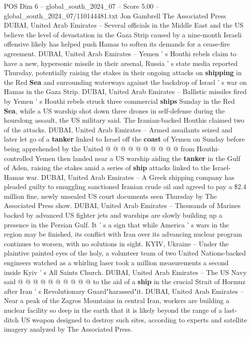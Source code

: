 \begin{textsample}{POS Dim 6 – global\_south\_2024\_07 – Score 5.00 – global\_south\_2024\_07/110144481.txt}  \label{ex:f6_pos_334}
Jon Gambrell The Associated Press DUBAI, United Arab Emirates -- Several officials in the Middle East and the US believe the level of devastation in the Gaza Strip caused by a nine-month Israeli offensive likely has helped push Hamas to soften its demands for a cease-fire agreement.
DUBAI, United Arab Emirates -- Yemen ' s Houthi rebels claim to have a new, hypersonic missile in their arsenal, Russia ' s state media reported Thursday, potentially raising the stakes in their ongoing attacks on \textbf{shipping} in the Red \textbf{Sea} and surrounding waterways against the backdrop of Israel ' s war on Hamas in the Gaza Strip.
DUBAI, United Arab Emirates -- Ballistic missiles fired by Yemen ' s Houthi rebels struck three commercial \textbf{ships} Sunday in the Red \textbf{Sea}, while a US warship shot down three drones in self-defense during the hourslong assault, the US military said.
The Iranian-backed Houthis claimed two of the attacks.
DUBAI, United Arab Emirates -- Armed assailants seized and later let go of a \textbf{tanker} linked to Israel off the \textbf{coast} of Yemen on Sunday before being apprehended by the United @ @ @ @ @ @ @ @ @ @ from Houthi-controlled Yemen then landed near a US warship aiding the \textbf{tanker} in the Gulf of Aden, raising the stakes amid a series of \textbf{ship} attacks linked to the Israel-Hamas war.
DUBAI, United Arab Emirates -- A Greek shipping company has pleaded guilty to smuggling sanctioned Iranian crude oil and agreed to pay a \$2.4 million fine, newly unsealed US court documents seen Thursday by The Associated Press show.
DUBAI, United Arab Emirates -- Thousands of Marines backed by advanced US fighter jets and warships are slowly building up a presence in the Persian Gulf.
It ' s a sign that while America ' s wars in the region may be finished, its conflict with Iran over its advancing nuclear program continues to worsen, with no solutions in sight.
KYIV, Ukraine -- Under the plaintive painted eyes of the holy, a volunteer team of two United Nations-backed engineers watched as a whirling laser took a million measurements a second inside Kyiv ' s All Saints Church.
DUBAI, United Arab Emirates -- The US Navy said @ @ @ @ @ @ @ @ @ @ to the aid of a \textbf{ship} in the crucial Strait of Hormuz after Iran ' s Revolutionary Guard"harassed"it.
DUBAI, United Arab Emirates -- Near a peak of the Zagros Mountains in central Iran, workers are building a nuclear facility so deep in the earth that it is likely beyond the range of a last-ditch US weapon designed to destroy such sites, according to experts and satellite imagery analyzed by The Associated Press.

\end{textsample}
